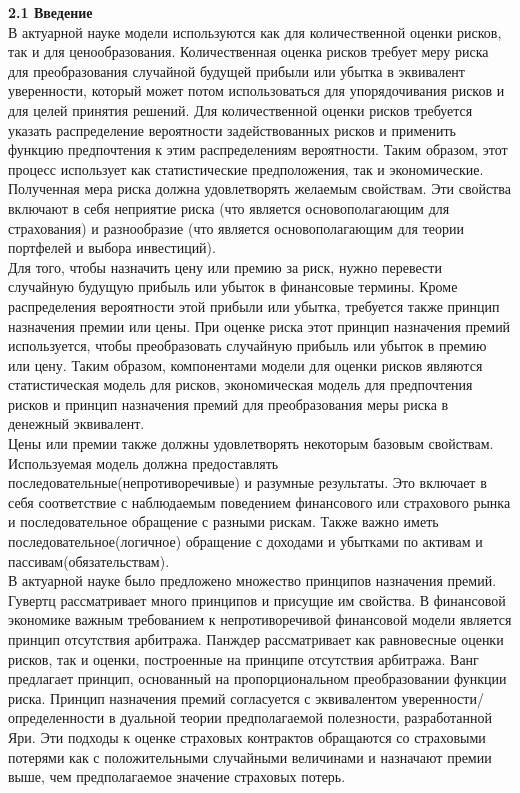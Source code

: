 \documentclass[12pt,a4paper]{article}
\begin{document}
{\bf \large 2.1 Введение}\\
В актуарной науке модели используются как для количественной оценки рисков, так и для ценообразования. 
Количественная оценка рисков требует меру риска для преобразования случайной будущей прибыли или убытка  в 
эквивалент уверенности, который может потом  использоваться для упорядочивания рисков и для целей принятия решений. Для количественной оценки рисков требуется указать распределение вероятности задействованных рисков и 
применить функцию предпочтения к этим распределениям вероятности.  Таким образом, этот процесс использует как статистические предположения, так и экономические.  Полученная мера риска должна удовлетворять желаемым свойствам. Эти свойства включают в себя неприятие риска (что является основополагающим для страхования) и разнообразие (что  является основополагающим для теории портфелей и выбора инвестиций). \\

Для того, чтобы назначить цену или премию за риск, нужно перевести случайную будущую прибыль или убыток  в финансовые термины. Кроме распределения вероятности этой прибыли или убытка, требуется также принцип назначения премии или цены. При оценке риска этот принцип назначения премий используется, чтобы преобразовать случайную прибыль или убыток в премию или цену. Таким образом, компонентами модели для оценки рисков являются статистическая модель для рисков, экономическая модель для предпочтения рисков и принцип назначения премий для преобразования меры риска в денежный эквивалент.\\
Цены или премии  также должны удовлетворять некоторым базовым свойствам. Используемая модель должна предоставлять последовательные(непротиворечивые) и разумные результаты. Это включает в себя соответствие с наблюдаемым поведением финансового или страхового рынка и последовательное обращение с разными рискам. Также важно иметь последовательное(логичное) обращение с доходами и убытками по активам и пассивам(обязательствам).\\
В актуарной науке было предложено множество принципов назначения премий.  Гувертц рассматривает много принципов и присущие им свойства. В финансовой экономике важным требованием к непротиворечивой финансовой модели является принцип отсутствия арбитража. Панждер рассматривает как равновесные оценки рисков, так и оценки, построенные на принципе отсутствия арбитража. Ванг предлагает принцип, основанный на пропорциональном преобразовании функции риска. Принцип назначения премий согласуется с эквивалентом уверенности/определенности в дуальной теории предполагаемой полезности, разработанной Яри. Эти подходы к оценке страховых контрактов обращаются со  страховыми потерями как с положительными случайными величинами и назначают премии выше, чем предполагаемое значение страховых потерь.
\end{document}
